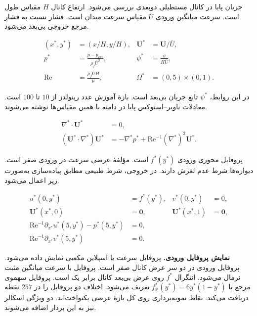 \label{sec:forward-flow-operator}

جریان پایا در کانال مستطیلی دوبعدی بررسی می‌شود.
ارتفاع کانال $H$ مقیاس طول است.
سرعت میانگین ورودی $\bar U$ مقیاس سرعت میدان است.
فشار نسبت به فشار مرجع خروجی بی‌بعد می‌شود.

\begin{equation}
\begin{aligned}
(x^*,y^*) &= (x/H,y/H),&
\mathbf U^* &= \mathbf U/\bar U,\\
p^* &= \frac{p-p_{\mathrm{ext}}}{\rho_f\bar U^2},&
\psi^* &= \frac{\psi}{H\bar U},\\
\mathrm{Re} &= \frac{\rho_f\bar U H}{\mu},&
\Omega^* &= (0,5)\times(0,1).
\end{aligned}
\label{eq:forward-flow-scales}
\end{equation}

در این روابط، $\psi^*$ تابع جریان بی‌بعد است.
بازهٔ آموزش عدد رینولدز از $10$ تا $100$ است.
معادلات ناویر–استوکس پایا در دامنه با همین مقیاس‌ها نوشته می‌شوند.

\begin{equation}
\begin{aligned}
\nabla^*\!\cdot\mathbf U^* &=0,\\
(\mathbf U^*\!\cdot\nabla^*)\mathbf U^*
&=-\nabla^*p^*+\mathrm{Re}^{-1}(\nabla^*)^2\mathbf U^* .
\end{aligned}
\label{eq:forward-flow-equations}
\end{equation}

پروفایل محوری ورودی $f^*(y^*)$ است.
مؤلفهٔ عرضی سرعت در ورودی صفر است.
دیواره‌ها شرط عدم لغزش دارند.
در خروجی، شرط طبیعی مطابق پیاده‌سازی به‌صورت زیر اعمال می‌شود.

\begin{equation}
\begin{aligned}
u^*(0,y^*)&=f^*(y^*), & v^*(0,y^*)&=0,\\
\mathbf U^*(x^*,0)&=\mathbf 0, &
\mathbf U^*(x^*,1)&=\mathbf 0,\\
\mathrm{Re}^{-1}\partial_{x^*}u^*(5,y^*)-p^*(5,y^*)&=0,\\
\mathrm{Re}^{-1}\partial_{x^*}v^*(5,y^*)&=0.
\end{aligned}
\label{eq:forward-flow-boundaries}
\end{equation}

\textbf{نمایش پروفایل ورودی.}
پروفایل سرعت با اسپلاین مکعبی نمایش داده می‌شود.
پروفایل ورودی در دو سر عرض کانال صفر است.
پروفایل با سرعت میانگین مثبت نرمال می‌شود.
انتگرال $f^*$ روی عرض بی‌بعد کانال برابر یک است.
پروفایل سهموی مرجع با $f_{\mathrm P}^*(y^*)=6y^*(1-y^*)$ تعریف می‌شود.
 اختلاف دو پروفایل را در $257$ نقطه دریافت می‌کند.
نقاط نمونه‌برداری روی کل بازهٔ عرضی یکنواخت‌اند.
دو ویژگی اسکالر نیز به این بردار اضافه می‌شوند.

